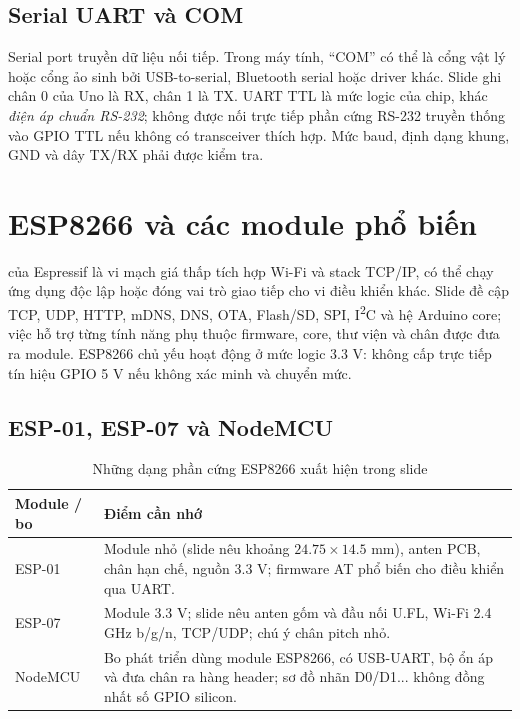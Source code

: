 \subsection{Serial UART và COM}
Serial port truyền dữ liệu nối tiếp. Trong máy tính, ``COM'' có thể là cổng vật lý hoặc cổng ảo sinh bởi USB-to-serial, Bluetooth serial hoặc driver khác. Slide ghi chân 0 của Uno là RX, chân 1 là TX. UART TTL là mức logic của chip, khác \emph{điện áp chuẩn RS-232}; không được nối trực tiếp phần cứng RS-232 truyền thống vào GPIO TTL nếu không có transceiver thích hợp. Mức baud, định dạng khung, GND và dây TX/RX phải được kiểm tra.

\section{ESP8266 và các module phổ biến}
 của Espressif là vi mạch giá thấp tích hợp Wi-Fi và stack TCP/IP, có thể chạy ứng dụng độc lập hoặc đóng vai trò giao tiếp cho vi điều khiển khác. Slide đề cập TCP, UDP, HTTP, mDNS, DNS, OTA, Flash/SD, SPI, I\textsuperscript{2}C và hệ Arduino core; việc hỗ trợ từng tính năng phụ thuộc firmware, core, thư viện và chân được đưa ra module. ESP8266 chủ yếu hoạt động ở mức logic $3.3$ V: không cấp trực tiếp tín hiệu GPIO 5 V nếu không xác minh và chuyển mức.

\subsection{ESP-01, ESP-07 và NodeMCU}
\begin{table}[htbp]\centering\small
\caption{Những dạng phần cứng ESP8266 xuất hiện trong slide}
\begin{tabularx}{\textwidth}{p{28mm}X}
\toprule
Module / bo & Điểm cần nhớ\\\midrule
ESP-01 & Module nhỏ (slide nêu khoảng $24.75\times14.5$ mm), anten PCB, chân hạn chế, nguồn 3.3 V; firmware AT phổ biến cho điều khiển qua UART.\\
ESP-07 & Module 3.3 V; slide nêu anten gốm và đầu nối U.FL, Wi-Fi 2.4 GHz b/g/n, TCP/UDP; chú ý chân pitch nhỏ.\\
NodeMCU & Bo phát triển dùng module ESP8266, có USB-UART, bộ ổn áp và đưa chân ra hàng header; sơ đồ nhãn D0/D1... không đồng nhất số GPIO silicon.\\\bottomrule
\end{tabularx}
\end{table}

